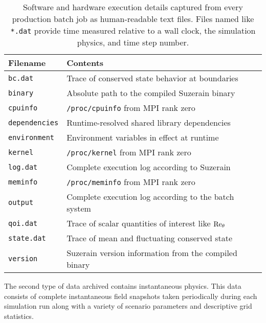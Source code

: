 \begin{table}
\centering
\caption[Execution details captured from each production batch job]{%
  Software and hardware execution details captured from every production batch
  job as human-readable text files.  Files named like \texttt{*.dat} provide time
  measured relative to a wall clock, the simulation physics, and time step
  number.\label{tbl:executiondetails}
}
\begin{small}
\begin{tabular}{p{}|p{}}
Filename & Contents \\ \hline \hline
\texttt{bc.dat}       & Trace of conserved state behavior at boundaries \\
\texttt{binary}       & Absolute path to the compiled Suzerain binary \\
\texttt{cpuinfo}      & \texttt{/proc/cpuinfo} from MPI rank zero \\
\texttt{dependencies} & Runtime-resolved shared library dependencies \\
\texttt{environment}  & Environment variables in effect at runtime \\
\texttt{kernel}       & \texttt{/proc/kernel} from MPI rank zero \\
\texttt{log.dat}      & Complete execution log according to Suzerain \\
\texttt{meminfo}      & \texttt{/proc/meminfo} from MPI rank zero \\
\texttt{output}       & Complete execution log according to the batch system \\
\texttt{qoi.dat}      & Trace of scalar quantities of interest like $\Reynolds[\theta]{}$ \\
\texttt{state.dat}    & Trace of mean and fluctuating conserved state \\
\texttt{version}      & Suzerain version information from the compiled binary
\end{tabular}
\end{small}
\end{table}

The second type of data archived contains instantaneous physics.  This data
consists of complete instantaneous field snapshots taken periodically during each
simulation run along with a variety of scenario parameters and descriptive grid
statistics.  

